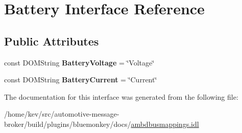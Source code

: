 \hypertarget{interfaceBattery}{\section{Battery Interface Reference}
\label{interfaceBattery}
}
\subsection*{Public Attributes}
\begin{DoxyCompactItemize}
\item 
\hypertarget{interfaceBattery_a2456b1f2d089f79ba7d9c2ed8f5e43fd}{const D\+O\+M\+String {\bfseries Battery\+Voltage} = \char`\"{}Voltage\char`\"{}}\label{interfaceBattery_a2456b1f2d089f79ba7d9c2ed8f5e43fd}

\item 
\hypertarget{interfaceBattery_a7917b13d651f01d4c746404a3db3ae11}{const D\+O\+M\+String {\bfseries Battery\+Current} = \char`\"{}Current\char`\"{}}\label{interfaceBattery_a7917b13d651f01d4c746404a3db3ae11}

\end{DoxyCompactItemize}


The documentation for this interface was generated from the following file\+:\begin{DoxyCompactItemize}
\item 
/home/kev/src/automotive-\/message-\/broker/build/plugins/bluemonkey/docs/\hyperlink{ambdbusmappings_8idl}{ambdbusmappings.\+idl}\end{DoxyCompactItemize}
